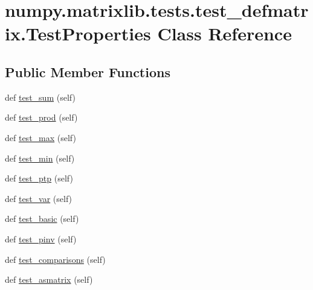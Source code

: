 \hypertarget{classnumpy_1_1matrixlib_1_1tests_1_1test__defmatrix_1_1TestProperties}{}\section{numpy.\+matrixlib.\+tests.\+test\+\_\+defmatrix.\+Test\+Properties Class Reference}
\label{classnumpy_1_1matrixlib_1_1tests_1_1test__defmatrix_1_1TestProperties}
\subsection*{Public Member Functions}
\begin{DoxyCompactItemize}
\item 
def \hyperlink{classnumpy_1_1matrixlib_1_1tests_1_1test__defmatrix_1_1TestProperties_a2c357ad94a83d3c11d22b8627dc99688}{test\+\_\+sum} (self)
\item 
def \hyperlink{classnumpy_1_1matrixlib_1_1tests_1_1test__defmatrix_1_1TestProperties_a2f85f076d3676aad1c4469fe54429f52}{test\+\_\+prod} (self)
\item 
def \hyperlink{classnumpy_1_1matrixlib_1_1tests_1_1test__defmatrix_1_1TestProperties_af459f10519257c80495356193615208c}{test\+\_\+max} (self)
\item 
def \hyperlink{classnumpy_1_1matrixlib_1_1tests_1_1test__defmatrix_1_1TestProperties_a5a0182813eca47f130ffac7381a41b3d}{test\+\_\+min} (self)
\item 
def \hyperlink{classnumpy_1_1matrixlib_1_1tests_1_1test__defmatrix_1_1TestProperties_a23416f4c52a4b45d595ac09dc0547004}{test\+\_\+ptp} (self)
\item 
def \hyperlink{classnumpy_1_1matrixlib_1_1tests_1_1test__defmatrix_1_1TestProperties_a6b3ed5b15f2329bb8c2abb07c40c7f0a}{test\+\_\+var} (self)
\item 
def \hyperlink{classnumpy_1_1matrixlib_1_1tests_1_1test__defmatrix_1_1TestProperties_af0db45646c7bdfc25edd3b1c04fd1676}{test\+\_\+basic} (self)
\item 
def \hyperlink{classnumpy_1_1matrixlib_1_1tests_1_1test__defmatrix_1_1TestProperties_a741ace870880f4838a7db11395f2254d}{test\+\_\+pinv} (self)
\item 
def \hyperlink{classnumpy_1_1matrixlib_1_1tests_1_1test__defmatrix_1_1TestProperties_a181265674eb86bed71157ff3dc975b59}{test\+\_\+comparisons} (self)
\item 
def \hyperlink{classnumpy_1_1matrixlib_1_1tests_1_1test__defmatrix_1_1TestProperties_a89fe25324f8f95a1c4563c029a9ce1ea}{test\+\_\+asmatrix} (self)

\end{DoxyCompactItemize}
